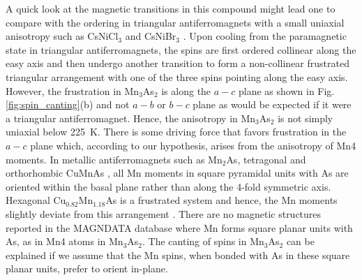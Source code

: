 \documentclass[10pt,doublespacing,edeposit]{uiucthesis2020}
\begin{document}
\begin{mainmatter}
A quick look at the magnetic transitions in this compound might lead one to compare with the ordering in triangular antiferromagnets with a small uniaxial anisotropy such as CsNiCl$_3$ and CsNiBr$_3$ \cite{Collins1997}. Upon cooling from the paramagnetic state in triangular antiferromagnets, the spins are first ordered collinear along the easy axis and then undergo another transition to form a non-collinear frustrated triangular arrangement with one of the three spins pointing along the easy axis. However, the frustration in Mn$_3$As$_2$ is along the $a-c$ plane as shown in Fig. \ref{fig:spin_canting}(b) and not $a-b$ or $b-c$ plane as would be expected if it were a triangular antiferromagnet. Hence, the anisotropy in Mn$_3$As$_2$ is not simply uniaxial below 225~K. There is some driving force that favors frustration in the $a-c$ plane which, according to our hypothesis, arises from the anisotropy of Mn4 moments.
In metallic antiferromagnets such as Mn$_2$As, tetragonal and orthorhombic CuMnAs \cite{Austin1962,MacA2012,Wadley2013}, all Mn moments in square pyramidal units with As are oriented within the basal plane rather than along the 4-fold symmetric axis.
Hexagonal Cu$_{0.82}$Mn$_{1.18}$As is a frustrated system and hence, the Mn moments slightly deviate from this arrangement \cite{Karigerasi2019}.
There are no magnetic structures reported in the MAGNDATA database \cite{Gallego2016_1,Gallego2016_2} where Mn forms square planar units with As, as in Mn4 atoms in Mn$_3$As$_2$. The canting of spins in Mn$_3$As$_2$ can be explained if we assume that the Mn spins, when bonded with As in these square planar units, prefer to orient in-plane.




\end{mainmatter}
\end{document}
